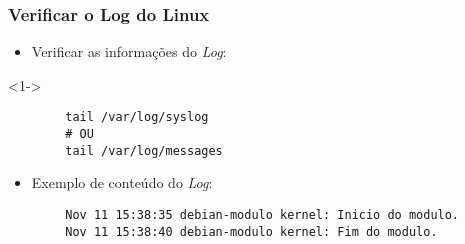 \begin{frame}[fragile]
	\frametitle{Verificar o Log do Linux}
	
	\begin{itemize}
		\item<1-> Verificar as informações do \textit{Log}:
	\end{itemize}

	\lstset{language=bash}
	\begin{block}<1->{}
	\begin{lstlisting}
		tail /var/log/syslog
		# OU
		tail /var/log/messages
	\end{lstlisting}
	\end{block}

	\pause
	
	\begin{itemize}
		\item<1-> Exemplo de conteúdo do \textit{Log}:
	\end{itemize}

	\lstset{language=TeX, numbers=none}
	\begin{lstlisting}
		Nov 11 15:38:35 debian-modulo kernel: Inicio do modulo.
		Nov 11 15:38:40 debian-modulo kernel: Fim do modulo.
	\end{lstlisting}

\end{frame}
